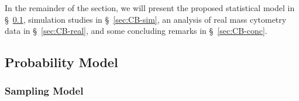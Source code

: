 \documentclass[12pt,]{article}
\begin{document}


In the remainder of the section, we will present the proposed statistical model
in \S~\ref{prob-model}, simulation studies in \S~\ref{sec:CB-sim}, an analysis
of real mass cytometry data in \S~\ref{sec:CB-real}, and some concluding remarks
in \S~\ref{sec:CB-conc}.









\subsection{Probability Model}\label{prob-model}
\subsubsection{Sampling Model} 
\end{document}
